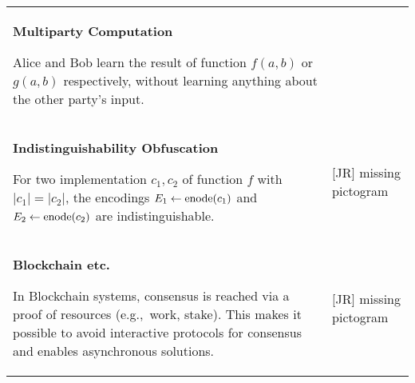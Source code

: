 \begin{longtable}{p{.4\linewidth}p{.6\linewidth}}
\textbf{Multiparty Computation}\par
Alice and Bob learn the result of function $f(a,b)$ or $g(a,b)$ respectively, without learning anything about the other party's input.
&
\begin{minipage}[t][][c]{\linewidth}
    \centering
    
\end{minipage}\\

\textbf{Indistinguishability Obfuscation}\par
For two implementation $c_1, c_2$ of function $f$ with $|c_1|=|c_2|$, the encodings $E_1\gets\mathrm{enode}(c_1)$ and $E_2\gets\mathrm{enode}(c_2)$ are indistinguishable.
&
\alert{[JR] missing pictogram}\\

\textbf{Blockchain etc.}\par
In Blockchain systems, consensus is reached via a proof of resources (e.g.,\ work, stake).
This makes it possible to avoid interactive protocols for consensus and enables asynchronous solutions.
&
\alert{[JR] missing pictogram}
\end{longtable}

